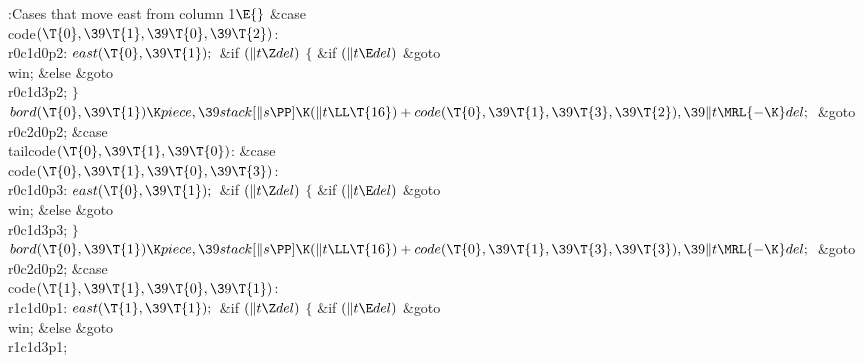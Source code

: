 \B{}:Cases that move east from column 1\X${}\E{}$\6
\4\&{case} \\{code}${}(\T{0},\39\T{1},\39\T{0},\39\T{2}){}$:\5
\\{r0c1d0p2}:\5
${}\\{east}(\T{0},\39\T{1});{}$\6
\&{if} ${}(\|t\Z\\{del}){}$\5
${}\{{}$\5
\1\&{if} ${}(\|t\E\\{del}){}$\1\5
\&{goto} \\{win};\5
\2\&{else}\1\5
\&{goto} \\{r0c1d3p2};\5
\2${}\}{}$\2\6
${}\\{bord}(\T{0},\39\T{1})\K\\{piece},\39\\{stack}[\|s\PP]\K(\|t\LL\T{16})+%
\\{code}(\T{0},\39\T{1},\39\T{3},\39\T{2}),\39\|t\MRL{-{\K}}\\{del};{}$\6
\&{goto} \\{r0c2d0p2};\6
\4\&{case} \\{tailcode}${}(\T{0},\39\T{1},\39\T{0}){}$:\5
\&{case} \\{code}${}(\T{0},\39\T{1},\39\T{0},\39\T{3}){}$:\5
\\{r0c1d0p3}:\5
${}\\{east}(\T{0},\39\T{1});{}$\6
\&{if} ${}(\|t\Z\\{del}){}$\5
${}\{{}$\5
\1\&{if} ${}(\|t\E\\{del}){}$\1\5
\&{goto} \\{win};\5
\2\&{else}\1\5
\&{goto} \\{r0c1d3p3};\5
\2${}\}{}$\2\6
${}\\{bord}(\T{0},\39\T{1})\K\\{piece},\39\\{stack}[\|s\PP]\K(\|t\LL\T{16})+%
\\{code}(\T{0},\39\T{1},\39\T{3},\39\T{3}),\39\|t\MRL{-{\K}}\\{del};{}$\6
\&{goto} \\{r0c2d0p2};\6
\4\&{case} \\{code}${}(\T{1},\39\T{1},\39\T{0},\39\T{1}){}$:\5
\\{r1c1d0p1}:\5
${}\\{east}(\T{1},\39\T{1});{}$\6
\&{if} ${}(\|t\Z\\{del}){}$\5
${}\{{}$\5
\1\&{if} ${}(\|t\E\\{del}){}$\1\5
\&{goto} \\{win};\5
\2\&{else}\1\5
\&{goto} \\{r1c1d3p1};\5
